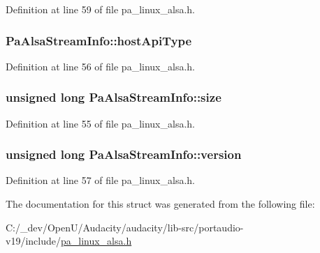 Definition at line 59 of file pa\+\_\+linux\+\_\+alsa.\+h.

\subsubsection[{\texorpdfstring{host\+Api\+Type}{hostApiType}}]{ Pa\+Alsa\+Stream\+Info\+::host\+Api\+Type}\hypertarget{struct_pa_alsa_stream_info_a57cc8d7a4f599b88c1d05e974f3d3db8}{}\label{struct_pa_alsa_stream_info_a57cc8d7a4f599b88c1d05e974f3d3db8}


Definition at line 56 of file pa\+\_\+linux\+\_\+alsa.\+h.

\subsubsection[{\texorpdfstring{size}{size}}]{\setlength{\rightskip}{0pt plus 5cm}unsigned long Pa\+Alsa\+Stream\+Info\+::size}\hypertarget{struct_pa_alsa_stream_info_aef7d7bcb7ebeb75d78496cc4821bbb85}{}\label{struct_pa_alsa_stream_info_aef7d7bcb7ebeb75d78496cc4821bbb85}


Definition at line 55 of file pa\+\_\+linux\+\_\+alsa.\+h.

\subsubsection[{\texorpdfstring{version}{version}}]{\setlength{\rightskip}{0pt plus 5cm}unsigned long Pa\+Alsa\+Stream\+Info\+::version}\hypertarget{struct_pa_alsa_stream_info_afb13c4ff1d97547735d7b19c1006b65c}{}\label{struct_pa_alsa_stream_info_afb13c4ff1d97547735d7b19c1006b65c}


Definition at line 57 of file pa\+\_\+linux\+\_\+alsa.\+h.



The documentation for this struct was generated from the following file\+:\begin{DoxyCompactItemize}
\item 
C\+:/\+\_\+dev/\+Open\+U/\+Audacity/audacity/lib-\/src/portaudio-\/v19/include/\hyperlink{pa__linux__alsa_8h}{pa\+\_\+linux\+\_\+alsa.\+h}\end{DoxyCompactItemize}
